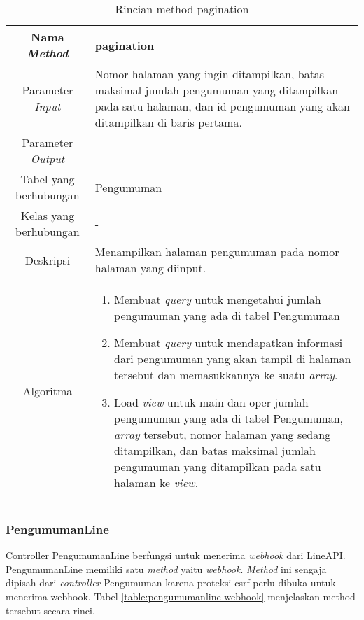 \begin{center}
	\begin{table}[H]
	\caption{Rincian method pagination}
	\label{table:pengumuman-pagination}
\begin{tabular}{|c|p{11cm}|}
\hline
Nama \textit{Method} 	& 	 pagination	\\
\hline
Parameter \textit{Input} &  Nomor halaman yang ingin ditampilkan, batas maksimal jumlah pengumuman yang ditampilkan pada satu halaman, dan id pengumuman yang akan ditampilkan di baris pertama.\\
\hline
Parameter \textit{Output} & - \\
\hline
Tabel yang berhubungan & Pengumuman \\
\hline
Kelas yang berhubungan & - \\
\hline
Deskripsi	& Menampilkan halaman pengumuman pada nomor halaman yang diinput.\\
\hline
Algoritma	& \begin{enumerate}
				\item Membuat \textit{query} untuk mengetahui jumlah pengumuman yang ada di tabel Pengumuman				
				\item Membuat \textit{query} untuk mendapatkan informasi dari pengumuman yang akan tampil di halaman tersebut dan memasukkannya ke suatu \textit{array}.
				\item Load \textit{view} untuk main dan oper jumlah pengumuman yang ada di tabel Pengumuman, \textit{array} tersebut, nomor halaman yang sedang ditampilkan, dan batas maksimal jumlah pengumuman yang ditampilkan pada satu halaman ke \textit{view}.
				\end{enumerate} \\
\hline
\end{tabular}
\end{table}
\end{center}

\subsubsection{PengumumanLine}
Controller PengumumanLine berfungsi untuk menerima \textit{webhook} dari LineAPI. PengumumanLine memiliki satu \textit{method} yaitu \textit{webhook}. \textit{Method} ini sengaja dipisah dari \textit{controller} Pengumuman karena proteksi csrf perlu dibuka untuk menerima webhook. Tabel \ref{table:pengumumanline-webhook} menjelaskan method tersebut secara rinci.

